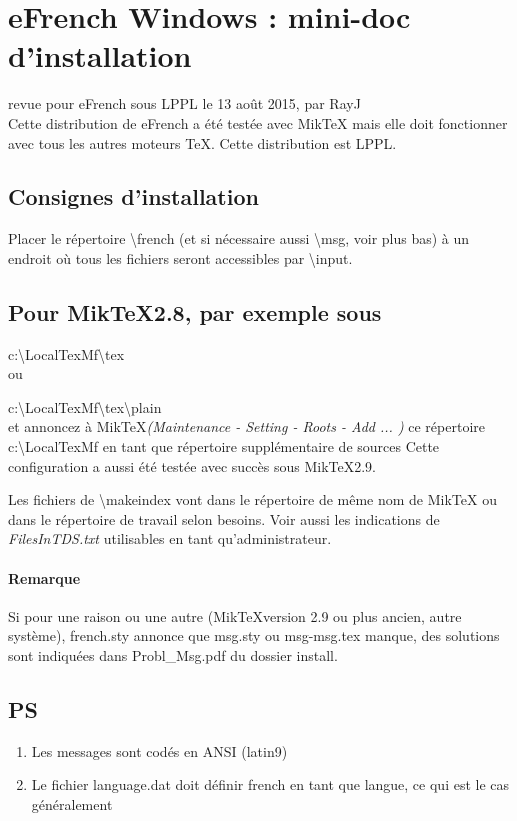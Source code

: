 \documentclass[11pt, a4paper]{article}
\author{Raymond Juillerat}
\begin{document}
\section*{eFrench Windows : mini-doc d'installation }
revue pour eFrench sous LPPL le 13 août 2015, par RayJ\\[3ex]

  Cette distribution de eFrench a été testée avec Mik\TeX{} mais elle doit 
fonctionner avec tous les autres moteurs \TeX. Cette distribution
est LPPL. 

\subsection*{Consignes d'installation}

Placer le répertoire \backslash french  (et si nécessaire aussi \backslash msg, voir plus bas) à un endroit où 
   tous les fichiers seront accessibles par \backslash input.
\subsection*{Pour Mik\TeX 2.8, par exemple sous} 
   c:\backslash LocalTexMf\backslash tex\\
ou

   c:\backslash LocalTexMf\backslash tex\backslash plain\\
   et annoncez à Mik\TeX \textit{(Maintenance - Setting - Roots - Add ... )}
   ce répertoire  c:\backslash LocalTexMf en tant que répertoire supplémentaire de sources    
Cette configuration a aussi été testée avec succès sous Mik\TeX 2.9.

Les fichiers de \backslash makeindex vont dans le répertoire de même nom de  Mik\TeX {}
ou dans le répertoire de travail selon besoins.
Voir aussi les indications de \emph{FilesInTDS.txt} utilisables en tant qu'administrateur.

\paragraph*{Remarque}
Si pour une raison ou une autre (Mik\TeX version 2.9 ou plus ancien, autre système), french.sty annonce que msg.sty  ou msg-msg.tex manque, 
des solutions sont indiquées dans Probl\_Msg.pdf du dossier install.
\subsection*{PS}
\begin{enumerate}
\item Les messages sont codés en ANSI (latin9) 
\item    Le fichier language.dat doit définir french en tant
	 que langue, ce qui est le cas généralement
\end{enumerate}
\end{document}
